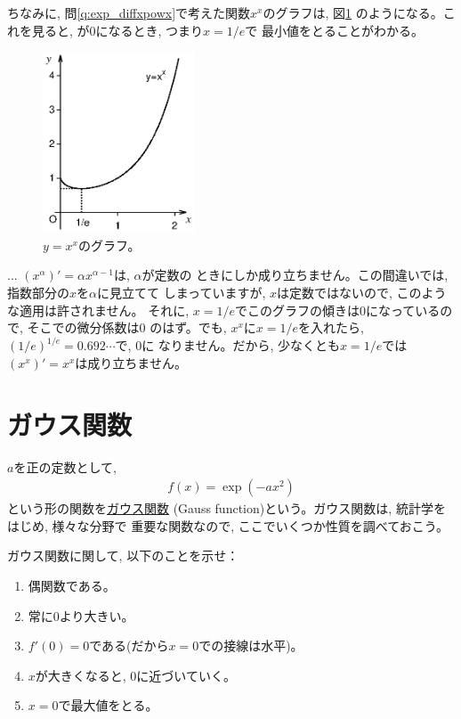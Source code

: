 ちなみに, 問\ref{q:exp_diffxpowx}で考えた関数$x^x$のグラフは, 図\ref{fig:x_pow_x}
のようになる。これを見ると, が0になるとき, つまり$x=1/e$で
最小値をとることがわかる。
\begin{figure}[h]
    \centering
    \includegraphics[width=4.5cm]{x_pow_x.eps}
    \caption{$y=x^x$のグラフ。}\label{fig:x_pow_x}
\end{figure}

\begin{freqmiss}{\small{} ... $(x^{\alpha})'=\alpha x^{\alpha-1}$は, $\alpha$が定数の
ときにしか成り立ちません。この間違いでは, 指数部分の$x$を$\alpha$に見立てて
しまっていますが, $x$は定数ではないので, このような適用は許されません。
それに, $x=1/e$でこのグラフの傾きは0になっているので, そこでの微分係数は0
のはず。でも, $x^x$に$x=1/e$を入れたら, $(1/e)^{1/e}=0.692\cdots$で, 0に
なりません。だから, 少なくとも$x=1/e$では$(x^x)'=x^x$は成り立ちません。}\end{freqmiss}
\mv





\section{ガウス関数}
$a$を正の定数として, 
\begin{eqnarray}
f(x)=\exp(-ax^2)\label{eq:Gauss_func}
\end{eqnarray}
という形の関数を\underline{ガウス関数} (Gauss function)という。ガウス関数は, 統計学をはじめ, 様々な分野で
重要な関数なので, ここでいくつか性質を調べておこう。\mv

\begin{q}\label{q:exp_Gauss} ガウス関数に関して, 以下のことを示せ：
\begin{enumerate}
\item 偶関数である。
\item 常に0より大きい。
\item $f'(0)=0$である(だから$x=0$での接線は水平)。
\item $x$が大きくなると, 0に近づいていく。
\item $x=0$で最大値をとる。
\end{enumerate}\end{q}\mv

